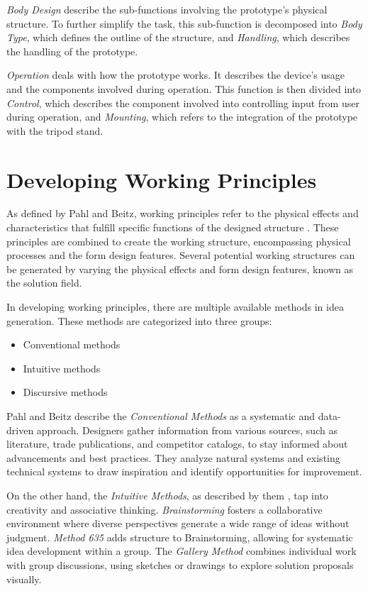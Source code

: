 \textit{Body Design} describe the sub-functions involving the prototype's physical structure. To further simplify the task, this sub-function is decomposed into \textit{Body Type}, which defines the outline of the structure, and \textit{Handling}, which describes the handling of the prototype.

\textit{Operation} deals with how the prototype works. It describes the device's usage and the components involved during operation. This function is then divided into \textit{Control}, which describes the component involved into controlling input from user during operation, and \textit{Mounting}, which refers to the integration of the prototype with the tripod stand.

\section{Developing Working Principles}

As defined by Pahl and Beitz, working principles refer to the physical effects and characteristics that fulfill specific functions of the designed structure \cite[181]{Pahl2007}. These principles are combined to create the working structure, encompassing physical processes and the form design features. Several potential working structures can be generated by varying the physical effects and form design features, known as the solution field.

In developing working principles, there are multiple available methods in idea generation. These methods are categorized into three groups:

\begin{itemize}
    \item Conventional methods
    \item Intuitive methods
    \item Discursive methods
\end{itemize}

Pahl and Beitz \cite[18-82]{Pahl2007} describe the \textit{Conventional Methods} as a systematic and data-driven approach. Designers gather information from various sources, such as literature, trade publications, and competitor catalogs, to stay informed about advancements and best practices. They analyze natural systems and existing technical systems to draw inspiration and identify opportunities for improvement.

On the other hand, the \textit{Intuitive Methods}, as described by them \cite[82-89]{Pahl2007}, tap into creativity and associative thinking. \textit{Brainstorming} fosters a collaborative environment where diverse perspectives generate a wide range of ideas without judgment. \textit{Method 635} adds structure to Brainstorming, allowing for systematic idea development within a group. The \textit{Gallery Method} combines individual work with group discussions, using sketches or drawings to explore solution proposals visually.

